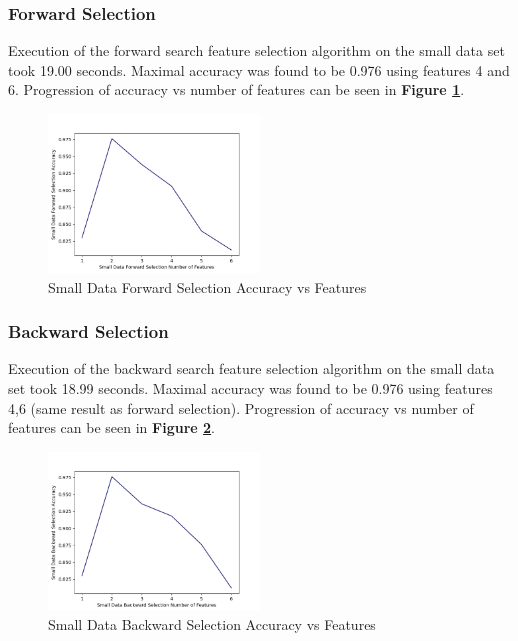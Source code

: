 \documentclass{article}
\begin{document}
\subsubsection{Forward Selection}
Execution of the forward search feature selection algorithm on the small data set took 19.00 seconds. Maximal accuracy was found to be 0.976 using features 4 and 6. Progression of accuracy vs number of features can be seen in \textbf{Figure \ref{fig:Small Data Forward Selection Accuracy vs Features}}.
\begin{figure}[ht]
	\centering
	\includegraphics[width = 0.5\textwidth]{SmallDataForwardSelection.png}
	\caption{Small Data Forward Selection Accuracy vs Features}
	\label{fig:Small Data Forward Selection Accuracy vs Features}
\end{figure}
\subsubsection{Backward Selection}
Execution of the backward search feature selection algorithm on the small data set took 18.99 seconds. Maximal accuracy was found to be 0.976 using features 4,6 (same result as forward selection). Progression of accuracy vs number of features can be seen in \textbf{Figure \ref{fig:Small Data Backward Selection Accuracy vs Features}}.
\begin{figure}[ht]
	\centering
	\includegraphics[width = 0.5\textwidth]{SmallDataBackwardSelection.png}
	\caption{Small Data Backward Selection Accuracy vs Features}
	\label{fig:Small Data Backward Selection Accuracy vs Features}
\end{figure}
\end{document}
